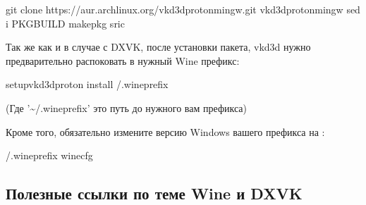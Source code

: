 \documentclass[letterpaper,10pt,russian,openany]{sphinxmanual}
\begin{document}
\begin{sphinxVerbatim}[commandchars=\\\{\}]
git clone https://aur.archlinux.org/vkd3d\PYGZhy{}proton\PYGZhy{}mingw.git 
 vkd3d\PYGZhy{}proton\PYGZhy{}mingw                                      
sed \PYGZhy{}i  PKGBUILD 
makepkg \PYGZhy{}sric                                              
\end{sphinxVerbatim}

\sphinxAtStartPar
Так же как и в случае с DXVK, после установки пакета, vkd3d нужно предварительно распоковать в нужный Wine префикс:

\begin{sphinxVerbatim}[commandchars=\\\{\}]
setup\PYGZus{}vkd3d\PYGZus{}proton install \PYGZti{}/.wineprefix
\end{sphinxVerbatim}

\sphinxAtStartPar
(Где '\textasciitilde{}/.wineprefix' \sphinxhyphen{} это путь до нужного вам префикса)

\sphinxAtStartPar
Кроме того, обязательно измените версию Windows вашего префикса на :

\begin{sphinxVerbatim}[commandchars=\\\{\}]
\PYGZti{}/.wineprefix winecfg
\end{sphinxVerbatim}

\noindent{}

\ignorespaces 

\subsection{Полезные ссылки по теме Wine и DXVK}
\label{\detokenize{source/linux-gaming:wine-dxvk}}\label{\detokenize{source/linux-gaming:wine-references}}\label{\detokenize{source/linux-gaming:index-12}}
\sphinxAtStartPar
{}
\end{document}
